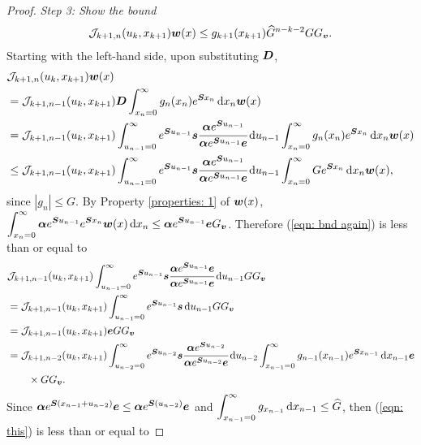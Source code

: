 \begin{proof}
\emph{Step 3: Show the bound}
	\begin{align}
            	\mathcal J_{k+1,n}(u_k,x_{k+1})  {\boldsymbol w}(x) \leq  g_{k+1}(x_{k+1})\widehat G^{n-k-2} G G_{\boldsymbol v}. \label{eqn: J bound}
	\end{align}
	Starting with the left-hand side, upon substituting \(\boldsymbol{D}\), 
	\begin{align}
		& \mathcal J_{k+1,n}(u_k,x_{k+1})  {\boldsymbol w}(x)  \nonumber 
		\\&= \mathcal J_{k+1,n-1}(u_k,x_{k+1})  \boldsymbol{D}
		\int_{x_n=0}^\infty g_{n}(x_n) e^{\boldsymbol{S}x_n} \, \mathrm{d} x_n{\boldsymbol w}(x) \nonumber
		\\&= \mathcal J_{k+1,n-1}(u_k,x_{k+1})  \int_{u_{n-1}=0}^\infty e^{\boldsymbol{S}u_{n-1}}\boldsymbol s \cfrac{\boldsymbol \alpha e^{\boldsymbol{S}u_{n-1}}}{\boldsymbol \alpha e^{\boldsymbol{S}u_{n-1}}\boldsymbol e}\, \mathrm{d}  u_{n-1}
		\int_{x_n=0}^\infty g_{n}(x_n) e^{\boldsymbol{S}x_n} \, \mathrm{d} x_n{\boldsymbol w}(x) \nonumber
		\\&\leq \mathcal J_{k+1,n-1}(u_k,x_{k+1})  \int_{u_{n-1}=0}^\infty e^{\boldsymbol{S}u_{n-1}}\boldsymbol s \cfrac{\boldsymbol \alpha e^{\boldsymbol{S}u_{n-1}}}{\boldsymbol \alpha e^{\boldsymbol{S}u_{n-1}}\boldsymbol e}\, \mathrm{d}  u_{n-1}
		\int_{x_n=0}^\infty G e^{\boldsymbol{S}x_n} \, \mathrm{d} x_n{\boldsymbol w}(x), \label{eqn: bnd again}
	\end{align}
	since \(|g_n|\leq G\). 
	By Property \ref{properties: 1} of \({\boldsymbol w}(x)\), \(\displaystyle\int_{x_n=0}^\infty \boldsymbol \alpha e^{\boldsymbol{S}u_{n-1}}e^{\boldsymbol{S}x_n} {\boldsymbol w}(x) \, \mathrm{d} x_n  \leq \boldsymbol \alpha e^{\boldsymbol{S}u_{n-1}}\boldsymbol eG_{\boldsymbol v}\). Therefore (\ref{eqn: bnd again}) is less than or equal to 
	\begin{align}
		&\mathcal J_{k+1,n-1}(u_k,x_{k+1})  \int_{u_{n-1}=0}^\infty e^{\boldsymbol{S}u_{n-1}}\boldsymbol s \cfrac{\boldsymbol \alpha e^{\boldsymbol{S}u_{n-1}}\boldsymbol e}{\boldsymbol \alpha e^{\boldsymbol{S}u_{n-1}}\boldsymbol e}\, \mathrm{d}  u_{n-1} G  G_{\boldsymbol v}\nonumber 
		\\& = \mathcal J_{k+1,n-1}(u_k,x_{k+1})  \int_{u_{n-1}=0}^\infty e^{\boldsymbol{S}u_{n-1}}\boldsymbol s \, \mathrm{d}  u_{n-1} G  G_{\boldsymbol v}\nonumber
		\\& = \mathcal J_{k+1,n-1}(u_k,x_{k+1})  \boldsymbol e G  G_{\boldsymbol v}\label{eqn: mid ref} 
		\\& = \mathcal J_{k+1,n-2}(u_k,x_{k+1}) \int_{u_{n-2}=0}^\infty e^{\boldsymbol{S}u_{n-2}}\boldsymbol s \cfrac{\boldsymbol \alpha e^{\boldsymbol{S}u_{n-2}}}{\boldsymbol \alpha e^{\boldsymbol{S}u_{n-2}}\boldsymbol e}\, \mathrm{d} u_{n-2}  \int_{x_{n-1}=0}^\infty g_{n-1}(x_{n-1}) e^{\boldsymbol{S}x_{n-1}} \, \mathrm{d} x_{n-1} \boldsymbol e \nonumber 
		\\&\qquad {} \times G  G_{\boldsymbol v}.\label{eqn: this}
	\end{align}
	Since \(\boldsymbol\alpha e^{\boldsymbol{S}(x_{n-1}+u_{n-2})}\boldsymbol e\leq  \boldsymbol\alpha e^{\boldsymbol{S}(u_{n-2})}\boldsymbol e\) and \(\displaystyle \int_{x_{n-1}=0}^\infty g_{x_{n-1}} \, \mathrm{d} x_{n-1}\leq \widehat G\), then (\ref{eqn: this}) is less than or equal to

\end{proof}
